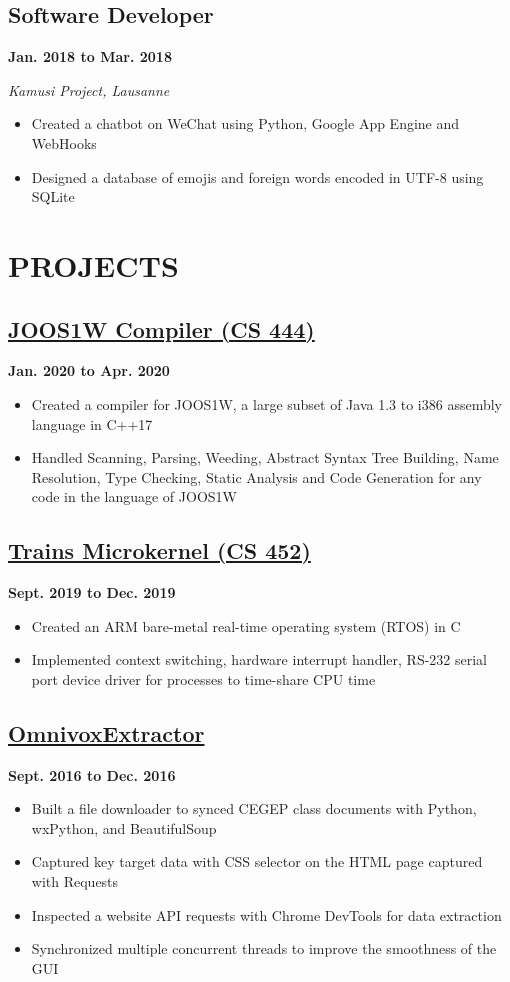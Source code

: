 \documentclass[12pt]{extarticle}
\begin{document}
\subsection*{Software Developer} \hfill \textbf{Jan. 2018 to Mar. 2018}

\textit{Kamusi Project, Lausanne}
\begin{itemize}
  \item Created a chatbot on WeChat using Python, Google App Engine and WebHooks
  \item Designed a database of emojis and foreign words encoded in UTF-8 using SQLite
\end{itemize}


\section*{PROJECTS}
\subsection*{\href{https://github.com/crash-overdrive/SLC}{JOOS1W Compiler (CS 444)}
} \hfill \textbf{Jan. 2020 to Apr. 2020}
\begin{itemize}
  \item Created a compiler for JOOS1W, a large subset of Java 1.3 to i386 assembly language in C++17
  \item Handled Scanning, Parsing, Weeding, Abstract Syntax Tree Building, Name Resolution, Type Checking, Static Analysis and Code Generation for any code in the language of JOOS1W
\end{itemize}

\subsection*{\href{https://github.com/cgwelcome/train-microkernel}{Trains Microkernel (CS 452)}} \hfill \textbf{Sept. 2019 to Dec. 2019}
\begin{itemize}
  \item Created an ARM bare-metal real-time operating system (RTOS) in C
  \item Implemented context switching, hardware interrupt handler, RS-232 serial port device driver for processes to time-share CPU time
\end{itemize}

\subsection*{\href{https://github.com/cgwelcome/omnivox-extractor}{OmnivoxExtractor}} \hfill \textbf{Sept. 2016 to Dec. 2016}
\begin{itemize}
  \item Built a file downloader to synced CEGEP class documents with Python, wxPython, and BeautifulSoup
  \item Captured key target data with CSS selector on the HTML page captured with Requests
  \item Inspected a website API requests with Chrome DevTools for data extraction
  \item Synchronized multiple concurrent threads to improve the smoothness of the GUI
\end{itemize}
\end{document}
